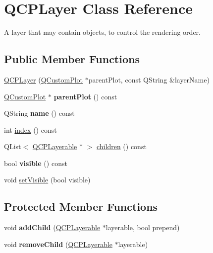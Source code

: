 \hypertarget{classQCPLayer}{\section{\-Q\-C\-P\-Layer \-Class \-Reference}
\label{classQCPLayer}
}


\-A layer that may contain objects, to control the rendering order.  


\subsection*{\-Public \-Member \-Functions}
\begin{DoxyCompactItemize}
\item 
\hyperlink{classQCPLayer_a5d0657fc86d624e5efbe930ef21af718}{\-Q\-C\-P\-Layer} (\hyperlink{classQCustomPlot}{\-Q\-Custom\-Plot} $\ast$parent\-Plot, const \-Q\-String \&layer\-Name)
\item 
\hypertarget{classQCPLayer_a3958c9a938c2d05a7378c41484acee08}{\hyperlink{classQCustomPlot}{\-Q\-Custom\-Plot} $\ast$ {\bfseries parent\-Plot} () const }\label{classQCPLayer_a3958c9a938c2d05a7378c41484acee08}

\item 
\hypertarget{classQCPLayer_a96ebd1e436f3813938cb9cd4a59a60be}{\-Q\-String {\bfseries name} () const }\label{classQCPLayer_a96ebd1e436f3813938cb9cd4a59a60be}

\item 
int \hyperlink{classQCPLayer_ad5d7010829a6b99f326b07d7e37c8c99}{index} () const 
\item 
\-Q\-List$<$ \hyperlink{classQCPLayerable}{\-Q\-C\-P\-Layerable} $\ast$ $>$ \hyperlink{classQCPLayer_a94c2f0100e48cefad2de8fe0fbb03c27}{children} () const 
\item 
\hypertarget{classQCPLayer_a9efca636e4dcad721999a6282f296016}{bool {\bfseries visible} () const }\label{classQCPLayer_a9efca636e4dcad721999a6282f296016}

\item 
void \hyperlink{classQCPLayer_ac07671f74edf6884b51a82afb2c19516}{set\-Visible} (bool visible)
\end{DoxyCompactItemize}
\subsection*{\-Protected \-Member \-Functions}
\begin{DoxyCompactItemize}
\item 
\hypertarget{classQCPLayer_a57ce5e49364aa9122276d5df3b4a0ddc}{void {\bfseries add\-Child} (\hyperlink{classQCPLayerable}{\-Q\-C\-P\-Layerable} $\ast$layerable, bool prepend)}\label{classQCPLayer_a57ce5e49364aa9122276d5df3b4a0ddc}

\item 
\hypertarget{classQCPLayer_ac2f64ac7761650582d968d86670ef362}{void {\bfseries remove\-Child} (\hyperlink{classQCPLayerable}{\-Q\-C\-P\-Layerable} $\ast$layerable)}\label{classQCPLayer_ac2f64ac7761650582d968d86670ef362}

\end{DoxyCompactItemize}
